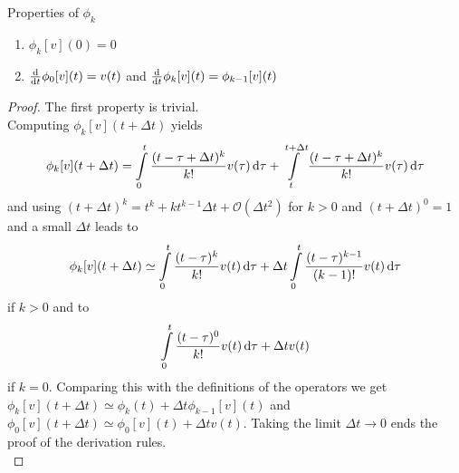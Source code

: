\begin{lemma}{Properties of $\phi_k$}{}
	\begin{enumerate}
	\item $\phi_k[v](0) = 0$
	\item $\frac{\text{d}}{\text{d} t}\phi_0[v](t)=v(t)$ and
	$\frac{\text{d}}{\text{d} t}\phi_k[v](t) = \phi_{k-1}[v](t)$
	\end{enumerate}
\end{lemma}
\begin{proof}
	The first property is trivial.\\
	Computing $\phi_k[v](t+\Delta t)$ yields
	\begin{equation}
	\phi_k[v](t+\Delta t) = \int\limits_0^t \frac{(t-\tau + \Delta t)^k}{k!} v(\tau) 
	\, \text{d} \tau + \int\limits_t^{t+\Delta t}   \frac{(t-\tau + \Delta t)^k}{k!} v(\tau) 
	\, \text{d} \tau 
	\end{equation}
	and using $(t+\Delta t)^k =t^k + k t^{k-1} \Delta t + \mathcal{O}(\Delta t^2)$ for 
	$k>0$ and $(t+\Delta t)^0 = 1$ and a small $\Delta t$ leads to 
	\begin{equation}
	\phi_k[v](t+\Delta t) \simeq \int\limits_0^t \frac{(t-\tau)^k}{k!} v(t) \, \text{d} \tau 
	+ \Delta t \int\limits_0^t \frac{(t-\tau)^{k-1}}{(k-1)!} v(t) \, \text{d} \tau
	\end{equation}
	if $k>0$ and to 
	\begin{equation}
	\int\limits_0^t \frac{(t-\tau)^0}{k!} v(t) \, \text{d} \tau +  \Delta t v(t)
	\end{equation}
	if $k=0$. Comparing this with the definitions of the operators we get \\
	$\phi_k[v](t+\Delta t) \simeq \phi_k(t) + \Delta t\phi_{k-1}[v](t)$ and 
	$\phi_0[v](t+\Delta t) \simeq \phi_0[v](t) + \Delta t v(t)$. Taking the limit 
	$\Delta t\to 0$ ends the proof of the derivation rules. \\
\end{proof}


